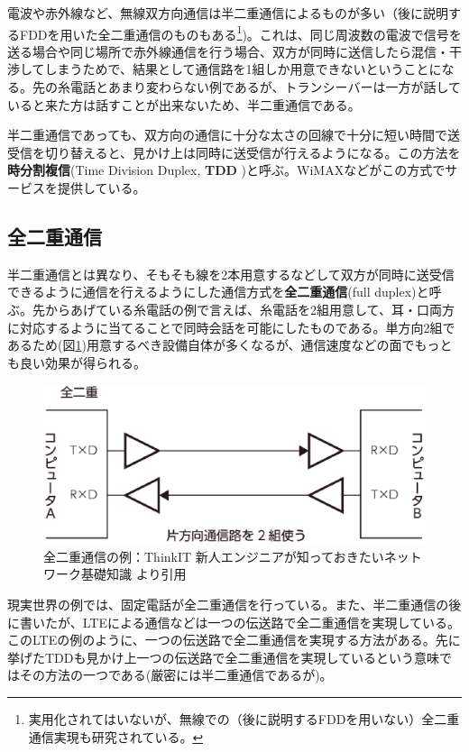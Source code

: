 電波や赤外線など、無線双方向通信は半二重通信によるものが多い（後に説明するFDDを用いた全二重通信のものもある\footnote{実用化されてはいないが、無線での（後に説明するFDDを用いない）全二重通信実現も研究されている。})。これは、同じ周波数の電波で信号を送る場合や同じ場所で赤外線通信を行う場合、双方が同時に送信したら混信・干渉してしまうためで、結果として通信路を1組しか用意できないということになる。先の糸電話とあまり変わらない例であるが、トランシーバーは一方が話していると来た方は話すことが出来ないため、半二重通信である。

半二重通信であっても、双方向の通信に十分な太さの回線で十分に短い時間で送受信を切り替えると、見かけ上は同時に送受信が行えるようになる。この方法を\textbf{時分割複信}(Time Division Duplex, \textbf{TDD} )と呼ぶ。WiMAXなどがこの方式でサービスを提供している。

\subsection{全二重通信}
半二重通信とは異なり、そもそも線を2本用意するなどして双方が同時に送受信できるように通信を行えるようにした通信方式を\textbf{全二重通信}(full duplex)と呼ぶ。先からあげている糸電話の例で言えば、糸電話を2組用意して、耳・口両方に対応するように当てることで同時会話を可能にしたものである。単方向2組であるため(図\ref{fig3_2})用意するべき設備自体が多くなるが、通信速度などの面でもっとも良い効果が得られる。
\begin{figure}[htb]
\centering
\includegraphics[width=0.7\linewidth,keepaspectratio]{fig/fig3_2.eps}
\caption{全二重通信の例：ThinkIT 新人エンジニアが知っておきたいネットワーク基礎知識 より引用}\label{fig3_2}
\end{figure}

現実世界の例では、固定電話が全二重通信を行っている。また、半二重通信の後に書いたが、LTEによる通信などは一つの伝送路で全二重通信を実現している。このLTEの例のように、一つの伝送路で全二重通信を実現する方法がある。先に挙げたTDDも見かけ上一つの伝送路で全二重通信を実現しているという意味ではその方法の一つである(厳密には半二重通信であるが)。

